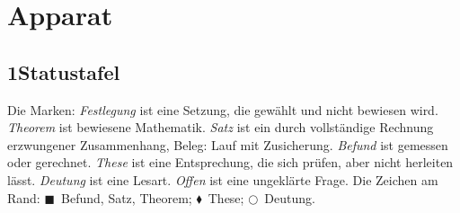 \documentclass[11pt,a4paper]{article}
\newcommand{\EB}{\textcolor{befund}{$\blacksquare$}}
\newcommand{\EE}{\textcolor{entspr}{$\blacklozenge$}}
\newcommand{\EL}{\textcolor{lesart}{$\bigcirc$}}
\begin{document}
\newpage
\section*{Apparat}

\subsection*{1\quad Statustafel}

Die Marken: \emph{Festlegung} ist eine Setzung, die gewählt und nicht bewiesen wird. \emph{Theorem} ist bewiesene Mathematik. \emph{Satz} ist ein durch vollständige Rechnung erzwungener Zusammenhang, Beleg: Lauf mit Zusicherung. \emph{Befund} ist gemessen oder gerechnet. \emph{These} ist eine Entsprechung, die sich prüfen, aber nicht herleiten lässt. \emph{Deutung} ist eine Lesart. \emph{Offen} ist eine ungeklärte Frage. Die Zeichen am Rand: \EB\ Befund, Satz, Theorem; \EE\ These; \EL\ Deutung.
\end{document}
